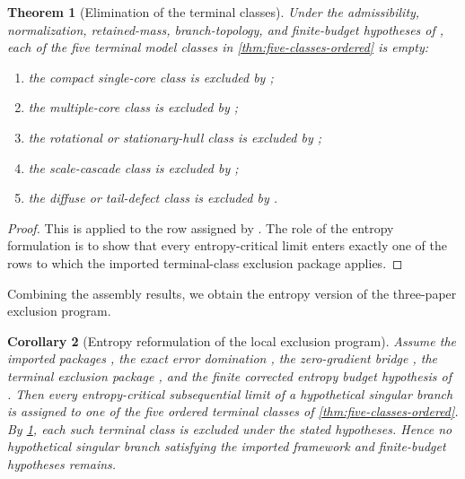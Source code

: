 \documentclass[11pt]{amsart}
\numberwithin{equation}{section}
\theoremstyle{plain}
\newtheorem{theorem}{Theorem}[section]
\newtheorem{corollary}[theorem]{Corollary}
\theoremstyle{definition}
\theoremstyle{remark}
\begin{document}
\begin{theorem}[Elimination of the terminal classes]
\label{thm:eliminate-terminal-classes}
Under the admissibility, normalization, retained-mass, branch-topology, and
finite-budget hypotheses of , each of the
five terminal model classes in \cref{thm:five-classes-ordered} is empty:
\begin{enumerate}[label=\textup{(\roman*)},leftmargin=2.2em]
	\item the compact single-core class is excluded by
	;
	\item the multiple-core class is excluded by
	;
	\item the rotational or stationary-hull class is excluded by
	;
	\item the scale-cascade class is excluded by
	;
	\item the diffuse or tail-defect class is excluded by
	.
\end{enumerate}
\end{theorem}

\begin{proof}
This is  applied to the row assigned by
.  The role of the entropy formulation is to
show that every entropy-critical limit enters exactly one of the rows to which
the imported terminal-class exclusion package applies.
\end{proof}

Combining the assembly results, we obtain the entropy version of the
three-paper exclusion program.

\begin{corollary}[Entropy reformulation of the local exclusion program]
\label{cor:entropy-reformulation}
Assume the imported packages
,
the exact error domination , the
zero-gradient bridge
,
the terminal exclusion package , and the
finite corrected entropy budget hypothesis of
.  Then every entropy-critical
subsequential limit of a hypothetical singular branch is assigned to one of
the five ordered terminal classes of \cref{thm:five-classes-ordered}.  By
\cref{thm:eliminate-terminal-classes}, each such terminal class is excluded
under the stated hypotheses.  Hence no hypothetical singular branch satisfying
the imported framework and finite-budget hypotheses remains.
\end{corollary}
\end{document}
